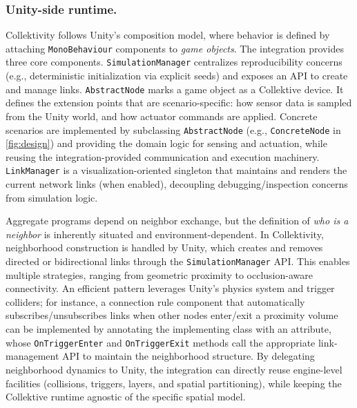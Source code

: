 \subsubsection{Unity-side runtime.}
Collektivity follows Unity's composition model, where behavior is defined by attaching \texttt{MonoBehaviour} components to \emph{game objects}.
The integration provides three core components.
%
\texttt{SimulationManager}
centralizes reproducibility concerns (e.g., deterministic initialization via explicit seeds) and exposes an API to create and manage links.
%
\texttt{AbstractNode} marks a game object as a Collektive device.
It defines the extension points that are scenario-specific:
how sensor data is sampled from the Unity world, and how actuator commands are applied.
%
Concrete scenarios are implemented by subclassing \texttt{AbstractNode} (e.g., \texttt{ConcreteNode} in \cref{fig:design}) and providing the
domain logic for sensing and actuation, while reusing the integration-provided communication and execution machinery.
%
\texttt{LinkManager} is a visualization-oriented singleton that maintains and renders the current network links (when enabled),
decoupling debugging/inspection concerns from simulation logic.

Aggregate programs depend on neighbor exchange, 
but the definition of \emph{who is a neighbor} is inherently situated and environment-dependent.
%
In Collektivity, 
neighborhood construction is handled by Unity, which creates and removes directed or bidirectional links through the
\texttt{SimulationManager} \ac{API}.
%
This enables multiple strategies, ranging from geometric proximity to occlusion-aware connectivity.
%
An efficient pattern leverages Unity's physics system and trigger colliders;
for instance, a connection rule component that automatically subscribes/unsubscribes links when other nodes enter/exit a proximity
volume can be implemented by annotating the implementing class with an attribute,
whose \texttt{OnTriggerEnter} and \texttt{OnTriggerExit} methods call the appropriate link-management \ac{API} to maintain the neighborhood structure.
%
%
%
%
%
By delegating neighborhood dynamics to Unity, the integration can directly reuse engine-level facilities (collisions, triggers, layers, and spatial
partitioning), while keeping the Collektive runtime agnostic of the specific spatial model.

